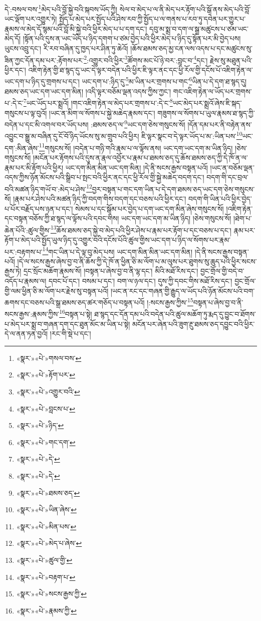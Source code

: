 དེ་:བསལ་བས་\footnote{«སྣར་»«པེ་»གསལ་བས་}མེད་པའི་བློ་སྐྱེ་བའི་སྐབས་ཡོད་ཀྱི། སེལ་བ་མེད་པ་ལ་ནི་མེད་པར་རྟོག་པའི་སྒོ་ནས་མེད་པའི་བློ་ཡང་ལྡོག་པར་འགྱུར་ཏེ། སྤྱོད་པ་མེད་པར་སྤྱོད་པའི་ཤེས་རབ་ཀྱི་སྤྱོད་པ་ལ་གནས་པ་རབ་ཏུ་དབེན་པར་གྱུར་པ་རྣམས་ལ་མེད་དོ་སྙམ་པའི་བློ་མི་སྐྱེ་བའི་ཕྱིར་མེད་པ་པ་དག་དང་། དབུ་མ་སྨྲ་བ་དག་ལ་སྒྲ་མཚུངས་པ་ཙམ་ཡང་མེད་དོ། །སྟོན་པའི་དུས་ན་ཡང་ཡོད་པ་ཉིད་དགག་པ་ཙམ་བྱེད་པའི་ཕྱིར་མེད་པ་ཉིད་དུ་སྟོན་པར་མི་བྱེད་པས། ཡུངས་འབྲུ་དང་། རི་རབ་བཞིན་དུ་ཁྱད་པར་ཤིན་ཏུ་ཆེའོ། །ཆོས་ཐམས་ཅད་མྱ་ངན་ལས་འདས་པ་དང་མཚུངས་སུ་ཟིན་ཀྱང་དོན་དམ་པར་:རྟོགས་པར་\footnote{«སྣར་»«པེ་»རྟོག་པར་}:འགྱུར་བའི་ཕྱིར་\footnote{«སྣར་»«པེ་»འགྱུར་བའི་}ཚོགས་མང་པོ་ཉེ་བར་:བླང་བ་\footnote{«སྣར་»«པེ་»བླངས་པ་}དང་། རྗེས་སུ་མཐུན་པའི་ཕྱིར་དང་། འཇིག་རྟེན་གྱི་ཐ་སྙད་དུ་ཡང་དེ་ལྟར་བདེན་པའི་ཕྱིར་ཇི་ལྟར་ནང་དང་ཕྱི་རོལ་གྱི་དངོས་པོ་འཇིག་རྟེན་ལ་ཡང་དག་པ་ཉིད་དུ་གྲགས་པ་དང་། ཡང་དག་པ་:ཉིད་དུ་\footnote{«སྣར་»«པེ་»ཉིད་}མ་ཡིན་པར་གྲགས་པ་གང་\footnote{«སྣར་»«པེ་»གང་དག་}ཡིན་པ་དེ་དག་ཐ་སྙད་དུ། ཐམས་ཅད་ཡང་དག་ཡང་དག་མིན། །འདི་ལྟར་བཅོམ་ལྡན་འདས་ཀྱིས་ཀྱང་། གང་འཇིག་རྟེན་ལ་ཡོད་པར་གྲགས་པ་:དེ་ང་\footnote{«སྣར་»«པེ་»དེ་}ཡང་ཡོད་པར་སྨྲའོ། །གང་འཇིག་རྟེན་ལ་མེད་པར་གྲགས་པ་:དེ་ང་\footnote{«སྣར་»«པེ་»དེ་}ཡང་མེད་པར་སྨྲའོ་ཞེས་ཇི་སྐད་གསུངས་པ་ལྟ་བུའོ། །ཡང་ན་མིག་ལ་སོགས་པ་སྐྱེ་མཆེད་རྣམས་དང་། གཟུགས་ལ་སོགས་པ་ཡུལ་རྣམས་ཐ་སྙད་ཀྱི་བདེན་པ་དང་མི་འགལ་བར་ཡོད་པས། :ཐམས་ཅད་ལ་\footnote{«སྣར་»«པེ་»ཐམས་ཅད་}ཡང་དག་ཅེས་གསུངས་སོ། །དོན་དམ་པར་ནི་བརྟེན་ནས་འབྱུང་བ་སྒྱུ་མ་བཞིན་དུ་ངོ་བོ་ཉིད་ཡོངས་སུ་མ་གྲུབ་པའི་ཕྱིར། ཇི་ལྟར་སྣང་བ་དེ་ལྟར་ཡོད་པ་མ་:ཡིན་པས་\footnote{«སྣར་»«པེ་»ཡིན་ཞེས་}ཡང་དག་:མིན་ཞེས་\footnote{«སྣར་»«པེ་»མིན་པས་}གསུངས་སོ། །བདེན་པ་གཉི་གའི་རྣམ་པ་ལ་ལྟོས་ནས། ཡང་དག་ཡང་དག་མ་ཡིན་ཉིད། །ཅེས་གསུངས་སོ། །མངོན་པར་རྟོགས་པའི་དུས་ན་རྣལ་འབྱོར་པ་རྣམ་པ་ཐམས་ཅད་དུ་ཆོས་ཐམས་ཅད་ཀྱི་དེ་ཁོ་ན་ལ་རྣམ་པར་མི་རྟོག་པའི་ཕྱིར། ཡང་དག་མིན་མིན་ཡང་དག་མིན། །དེ་ནི་སངས་རྒྱས་བསྟན་པའོ། །ཡང་ན་བཅོམ་ལྡན་འདས་ཀྱིས་ཉོན་མོངས་པའི་སྒྲིབ་པ་སྤང་བའི་ཕྱིར་ནང་དང་ཕྱི་རོལ་གྱི་སྐྱེ་མཆེད་བདག་དང་། བདག་གི་དང་བྲལ་བའི་མཚན་ཉིད་གཡོ་བ་:མེད་པ་ཤེས་\footnote{«སྣར་»«པེ་»མེད་པ་ཞེས་}བྱར་བསྟན་པ་གང་དག་ཡིན་པ་དེ་དག་ཐམས་ཅད་ཡང་དག་ཅེས་གསུངས་སོ། །རྣམ་པར་ཤེས་པའི་མཚན་ཉིད་ཀྱི་བདག་གིས་བདག་དང་བཅས་པའི་ཕྱིར་དང་། བདག་གི་ཡིན་པའི་ཕྱིར་བྱེད་པ་པོར་བརྗོད་པས་ཉན་པ་དང་། སེམས་པ་དང་སྒོམ་པར་བྱེད་པ་དག་ཡང་དག་མིན་ཞེས་གསུངས་སོ། །འཇིག་རྟེན་དང་བསྟན་བཅོས་ཀྱི་ཐ་སྙད་ལ་ལྟོས་པའི་དབང་གིས། ཡང་དག་ཡང་དག་མ་ཡིན་ཉིད། །ཅེས་གསུངས་སོ། །ཐེག་པ་ཆེན་པོའི་:ཚུལ་གྱིས་\footnote{«སྣར་»«པེ་»ཚུལ་གྱི་}ཆོས་ཐམས་ཅད་སྐྱེ་བ་མེད་པའི་ཕྱིར་ཤེས་པ་རྣམ་པར་རྟོག་པ་དང་བཅས་པ་དང་། རྣམ་པར་རྟོག་པ་མེད་པའི་སྤྱོད་ཡུལ་ཉིད་དུ་འགྱུར་བའི་དངོས་པོའི་ཚུལ་གྱིས་ཡང་དག་པ་ཉིད་ལ་སོགས་པར་རྣམ་པར་:བརྟགས་པ་\footnote{«སྣར་»«པེ་»བརྟག་པ་}གང་ཡིན་པ་དེ་ལྟ་བུ་མེད་པས། ཡང་དག་མིན་མིན་ཡང་དག་མིན། །དེ་ནི་སངས་རྒྱས་བསྟན་པའོ། །དེ་ལ་སངས་རྒྱས་ཞེས་བྱ་བ་ནི་ཆོས་ཀྱི་དེ་ཁོ་ན་ཕྱིན་ཅི་མ་ལོག་པ་མ་ལུས་པར་ཐུགས་སུ་ཆུད་པའི་ཕྱིར་སངས་རྒྱས་ཏེ། དྲང་སྲོང་མཆོག་རྣམས་སོ། །བསྟན་པ་ཞེས་བྱ་བ་ནི་ལྷ་དང་། མིའི་མཐོ་རིས་དང་། བྱང་གྲོལ་གྱི་བདེ་བ་འདོད་པ་རྣམས་ལ། དབང་པོ་དང་། བསམ་པ་དང་། བག་ལ་ཉལ་དང་། དུས་ཀྱི་དབང་གིས་མཐོ་རིས་དང་། བྱང་གྲོལ་གྱི་ལམ་ཕྱིན་ཅི་མ་ལོག་པར་རྗེས་སུ་བསྟན་པའོ། །ཡང་ན་རང་དང་གཞན་གྱི་རྒྱུད་ལ་ཡོད་པའི་ཉོན་མོངས་པའི་བག་ཆགས་དང་བཅས་པའི་སྒྲ་ཐམས་ཅད་ཚར་གཅོད་པ་བསྟན་པའོ། །:སངས་རྒྱས་ཀྱིས་\footnote{«སྣར་»«པེ་»སངས་རྒྱས་ཀྱི་}བསྟན་པ་ཞེས་བྱ་བ་ནི་སངས་རྒྱས་:རྣམས་ཀྱིས་\footnote{«སྣར་»«པེ་»རྣམས་ཀྱི་}བསྟན་པ་སྟེ། ཐ་སྙད་དང་དོན་དམ་པའི་བདེན་པའི་ཚུལ་མཆོག་ཏུ་རྨད་དུ་བྱུང་བ་ཐོགས་པ་མེད་པར་སྨྲ་བ་གཞན་དག་དང་ཐུན་མོང་མ་ཡིན་པ་སྟེ། མངོན་པར་ཞེན་པའི་ཟུག་རྔུ་ཐམས་ཅད་དབྱུང་བའི་ཕྱིར་དེ་ལ་ནན་ཏན་བྱའོ། །རང་གི་སྡེ་པ་དང་། 
